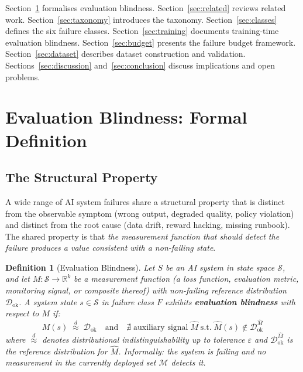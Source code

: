 \documentclass{article}
\newtheorem{definition}{Definition}
\begin{document}
Section~\ref{sec:blindness} formalises evaluation blindness.
Section~\ref{sec:related} reviews related work.
Section~\ref{sec:taxonomy} introduces the taxonomy.
Section~\ref{sec:classes} defines the six failure classes.
Section~\ref{sec:training} documents training-time evaluation blindness.
Section~\ref{sec:budget} presents the failure budget framework.
Section~\ref{sec:dataset} describes dataset construction and validation.
Sections~\ref{sec:discussion} and~\ref{sec:conclusion} discuss implications
and open problems.

\section{Evaluation Blindness: Formal Definition}
\label{sec:blindness}

\subsection{The Structural Property}

A wide range of AI system failures share a structural property that is
distinct from the observable symptom (wrong output, degraded quality,
policy violation) and distinct from the root cause (data drift, reward
hacking, missing runbook).  The shared property is that \emph{the
measurement function that should detect the failure produces a value
consistent with a non-failing state}.

\begin{definition}[Evaluation Blindness]
\label{def:eb}
Let $S$ be an AI system in state space $\mathcal{S}$, and let $M :
\mathcal{S} \to \mathbb{R}^k$ be a measurement function (a loss function,
evaluation metric, monitoring signal, or composite thereof) with
non-failing reference distribution $\mathcal{D}_{\text{ok}}$.  A system
state $s \in \mathcal{S}$ in failure class $F$ exhibits
\textbf{evaluation blindness} with respect to $M$ if:
\[
  M(s) \;\overset{d}{\approx}\; \mathcal{D}_{\text{ok}}
  \quad \text{and} \quad
  \nexists\; \text{auxiliary signal} \;\hat{M} \;\text{s.t.}\;
  \hat{M}(s) \notin \mathcal{D}^{\hat{M}}_{\text{ok}}
\]
where $\overset{d}{\approx}$ denotes distributional indistinguishability
up to tolerance $\varepsilon$ and $\mathcal{D}^{\hat{M}}_{\text{ok}}$ is
the reference distribution for $\hat{M}$.  Informally: the system is
failing and no measurement in the \emph{currently deployed} set
$\mathcal{M}$ detects it.
\end{definition}
\end{document}
